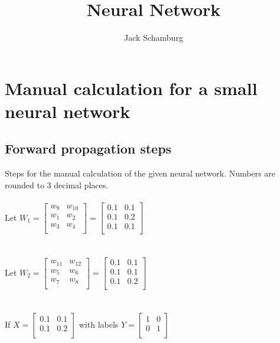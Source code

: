 \documentclass{article}
\title{Neural Network}
\author{Jack Schamburg}
\begin{document}
\maketitle
\newpage

\section{Manual calculation for a small neural network}

\subsection{Forward propagation steps}
Steps for the manual calculation of the given neural network. Numbers are
rounded to 3 decimal places.\\
\\Let $W_1 =
\begin{bmatrix}
w_9 & w_{10} \\
w_1 & w_2 \\
w_3 & w_4 \\
\end{bmatrix} =
\begin{bmatrix}
0.1 &  0.1\\
0.1 & 0.2 \\
0.1 & 0.1 \\
\end{bmatrix}$\\
\\
\\Let $W_2 =
\begin{bmatrix}
w_{11} & w_{12} \\
w_5 & w_6 \\
w_7 & w_8 \\
\end{bmatrix} =
\begin{bmatrix}
0.1 & 0.1 \\
0.1 & 0.1 \\
0.1 & 0.2 \\
\end{bmatrix}$ \\
\\
\\If $X = \begin{bmatrix}
0.1 &  0.1 \\
0.1 &  0.2 \\
\end{bmatrix}$ with labels $Y = \begin{bmatrix}
1 & 0 \\
0 &  1 \\
\end{bmatrix}$ \\
\end{document}
